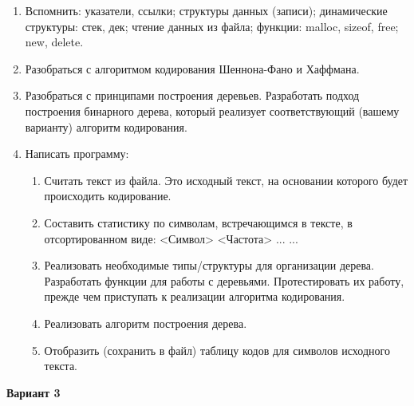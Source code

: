 \begin{enumerate}
    \item Вспомнить: указатели, ссылки; структуры данных (записи); динамические структуры: стек, дек; чтение данных из файла; функции: malloc, sizeof, free; new, delete.
    \item Разобраться с алгоритмом кодирования Шеннона-Фано и Хаффмана.
    \item Разобраться с принципами построения деревьев. Разработать подход построения бинарного дерева, который реализует соответствующий (вашему варианту) алгоритм кодирования.
    \item Написать программу:
    \begin{enumerate}
        \item Считать текст из файла. Это исходный текст, на основании которого будет происходить кодирование.
        \item Составить статистику по символам, встречающимся в тексте, в отсортированном виде: <Символ> <Частота> ... ...
        \item Реализовать необходимые типы/структуры для организации дерева. Разработать функции для работы с деревьями. Протестировать их работу, прежде чем приступать к реализации алгоритма кодирования.
        \item Реализовать алгоритм построения дерева.
        \item Отобразить (сохранить в файл) таблицу кодов для символов исходного текста.
    \end{enumerate}
\end{enumerate}

\newpage

\textbf{Вариант 3}



\newpage



\newpage



